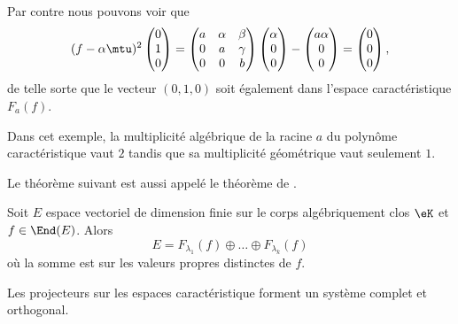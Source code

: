 \begin{remark}
    Par contre nous pouvons voir que
    \begin{equation}
        (f-\alpha\mtu)^2\begin{pmatrix}
             0   \\ 
            1    \\ 
            0    
        \end{pmatrix}=
        \begin{pmatrix}
            a    &   \alpha    &   \beta    \\
            0    &   a    &   \gamma    \\
            0    &   0    &   b
        \end{pmatrix}
        \begin{pmatrix}
            \alpha    \\ 
            0    \\ 
            0    
        \end{pmatrix}-\begin{pmatrix}
            a\alpha    \\ 
            0    \\ 
            0    
        \end{pmatrix}=\begin{pmatrix}
            0    \\ 
            0    \\ 
            0    
        \end{pmatrix},
    \end{equation}
    de telle sorte que le vecteur \( (0,1,0)\) soit également dans l'espace caractéristique \( F_a(f)\).

    Dans cet exemple, la multiplicité algébrique de la racine \( a\) du polynôme caractéristique vaut \( 2\) tandis que sa multiplicité géométrique vaut seulement \( 1\).
\end{remark}

Le théorème suivant est aussi appelé le théorème de .


\begin{theorem}     \label{ThoSpectraluRMLok}
    Soit \( E\) espace vectoriel de dimension finie sur le corps algébriquement clos \( \eK\) et \( f\in\End(E)\). Alors
    \begin{equation}
        E=F_{\lambda_1}(f)\oplus\ldots\oplus F_{\lambda_k}(f)
    \end{equation}
    où la somme est sur les valeurs propres distinctes de \( f\).

    Les projecteurs sur les espaces caractéristique forment un système complet et orthogonal.
\end{theorem}

